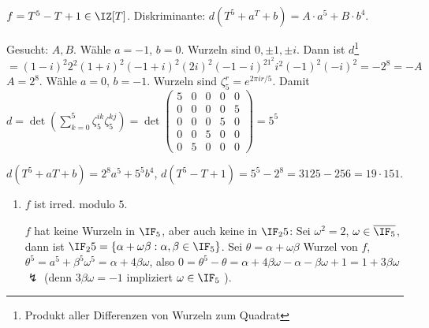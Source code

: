   \begin{Beispiel}[E. ARTIN]
   $f=T^5-T+1\in\IZ[T]$. Diskriminante: $d(T^5+a^T+b)=A\cdot a^5+B\cdot b^4$.
   
   Gesucht: $A,B$. Wähle $a=-1$, $b=0$. Wurzeln sind $0, \pm 1, \pm i$. Dann ist $d$\footnote{Produkt aller Differenzen von Wurzeln zum Quadrat}$=(1-i)^2 2^2 (1+i)^2 (-1+i)^2 (2i)^2(-1-i)^21^2i^2(-1)^2(-i)^2=-2^8=-A$ \folge $A=2^8$. Wähle $a=0$, $b=-1$. Wurzeln sind $\zeta_5^r=e^{2\pi ir/5}$. Damit $d=\det(\sum_{k=0}^5 \zeta_5^{ik}\zeta_5^{kj})=\det\begin{pmatrix}
                                                      5 & 0 & 0 & 0 & 0\\ 0 & 0 & 0 & 0 & 5\\  0 & 0 & 0 & 5 & 0 \\ 0 & 0 & 5 & 0 & 0\\ 0 & 5 & 0 & 0 & 0                                                                                                                                                                                                                                                                                                          
                                                                                                                                                                                                                                                                                                                                                               \end{pmatrix}=5^5$
                                                                                                                                                                                                                                                                                                                                                               
$d(T^5+aT+b)=2^8a^5+5^5b^4$, $d(T^5-T+1)=5^5-2^8=3125-256=19\cdot 151$.
\begin{enumerate}
 \item $f$ ist irred. modulo $5$.
 
 $f$ hat keine Wurzeln in $\IF_5$, aber auch keine in $\IF_25$: Sei $\omega^2=2$, $\omega\in\overline{\IF_5}$, dann ist $\IF_25=\{ \alpha+\omega\beta : \alpha,\beta\in\IF_5\}$. Sei $\theta=\alpha+\omega\beta$ Wurzel von $f$, $\theta^5=a^5+\beta^5\omega^5=\alpha+4\beta\omega$, also 
 $0=\theta^5-\theta=\alpha+4\beta\omega-\alpha-\beta\omega+1=1+3\beta\omega$ $\lightning$ (denn $3\beta\omega=-1$ impliziert $\omega\in\IF_5$ \lightning).
 

\end{enumerate}
\end{Beispiel}
